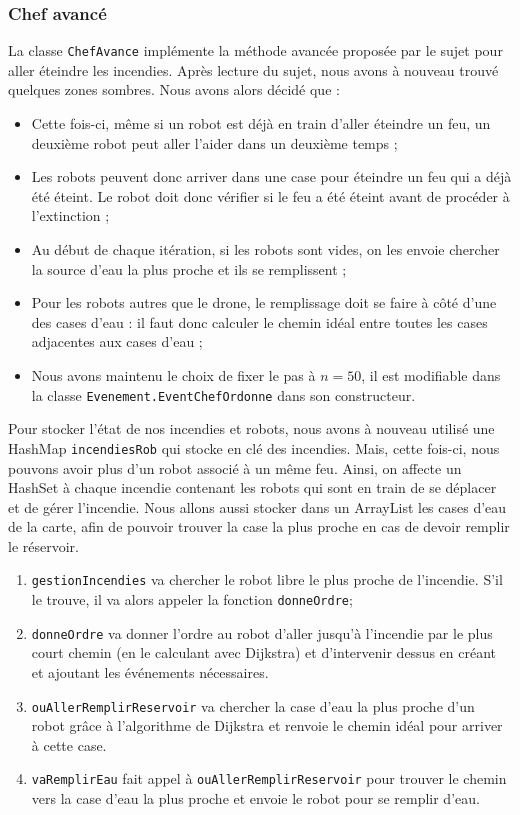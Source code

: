 \documentclass[a4paper,10pt]{article} %
\begin{document}
\subsubsection{Chef avancé}
La classe \texttt{ChefAvance} implémente la méthode avancée proposée par le sujet pour aller éteindre les incendies. Après lecture du sujet, nous avons à nouveau trouvé quelques zones sombres. Nous avons alors décidé que :
\begin{itemize}
    \item Cette fois-ci, même si un robot est déjà en train d'aller éteindre un feu, un deuxième robot peut aller l'aider dans un deuxième temps ;
    \item Les robots peuvent donc arriver dans une case pour éteindre un feu qui a déjà été éteint. Le robot doit donc vérifier si le feu a été éteint avant de procéder à l'extinction ;
    \item Au début de chaque itération, si les robots sont vides, on les envoie chercher la source d'eau la plus proche et ils se remplissent ;
    \item Pour les robots autres que le drone, le remplissage doit se faire à côté d'une des cases d'eau : il faut donc calculer le chemin idéal entre toutes les cases adjacentes aux cases d'eau ;
    \item Nous avons maintenu le choix de fixer le pas à $n=50$, il est modifiable dans la classe \texttt{Evenement.EventChefOrdonne} 
    dans son constructeur.
\end{itemize}

Pour stocker l'état de nos incendies et robots, nous avons à nouveau utilisé une HashMap \texttt{incendiesRob} qui stocke en clé des incendies. Mais, cette fois-ci, nous pouvons avoir plus d'un robot associé à un même feu. Ainsi, on affecte un HashSet à chaque incendie contenant les robots qui sont en train de se déplacer et de gérer l'incendie.
Nous allons aussi stocker dans un ArrayList les cases d'eau de la carte, afin de pouvoir trouver la case la plus proche en cas de devoir remplir le réservoir.

\begin{enumerate}
    \item \texttt{gestionIncendies} va chercher le robot libre le plus proche de l'incendie. S'il le trouve, il va alors appeler la fonction \texttt{donneOrdre};
    \item \texttt{donneOrdre} va donner l'ordre au robot d'aller jusqu'à l'incendie par le plus court chemin (en le calculant avec Dijkstra)
    et d'intervenir dessus en créant et ajoutant les événements nécessaires.
    \item \texttt{ouAllerRemplirReservoir} va chercher la case d'eau la plus proche d'un robot grâce à l'algorithme de Dijkstra et renvoie le chemin idéal pour arriver à cette case.
    \item \texttt{vaRemplirEau} fait appel à \texttt{ouAllerRemplirReservoir} pour trouver le chemin vers la case d'eau la plus proche et envoie le robot pour se remplir d'eau.
\end{enumerate}
\end{document}
